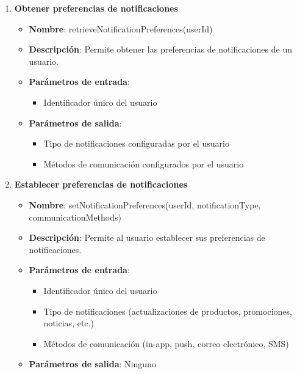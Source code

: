 \begin{enumerate}[label=SOP-\protect\twodigits{\arabic*}:, align=left, leftmargin=*]
\item \textbf{Obtener preferencias de notificaciones}
\begin{itemize}
\item \textbf{Nombre}: retrieveNotificationPreferences(userId)
\item \textbf{Descripción}: Permite obtener las preferencias de notificaciones de un usuario.
\item \textbf{Parámetros de entrada}:
\begin{itemize}
\item Identificador único del usuario
\end{itemize}
\item \textbf{Parámetros de salida}:
\begin{itemize}
\item Tipo de notificaciones configuradas por el usuario
\item Métodos de comunicación configurados por el usuario
\end{itemize}
\end{itemize}

\item \textbf{Establecer preferencias de notificaciones}
\begin{itemize}
\item \textbf{Nombre}: setNotificationPreferences(userId, notificationType, communicationMethods)
\item \textbf{Descripción}: Permite al usuario establecer sus preferencias de notificaciones.
\item \textbf{Parámetros de entrada}:
\begin{itemize}
\item Identificador único del usuario
\item Tipo de notificaciones (actualizaciones de productos, promociones, noticias, etc.)
\item Métodos de comunicación (in-app, push, correo electrónico, SMS)
\end{itemize}
\item \textbf{Parámetros de salida}: Ninguno
\end{itemize}


\end{enumerate}

